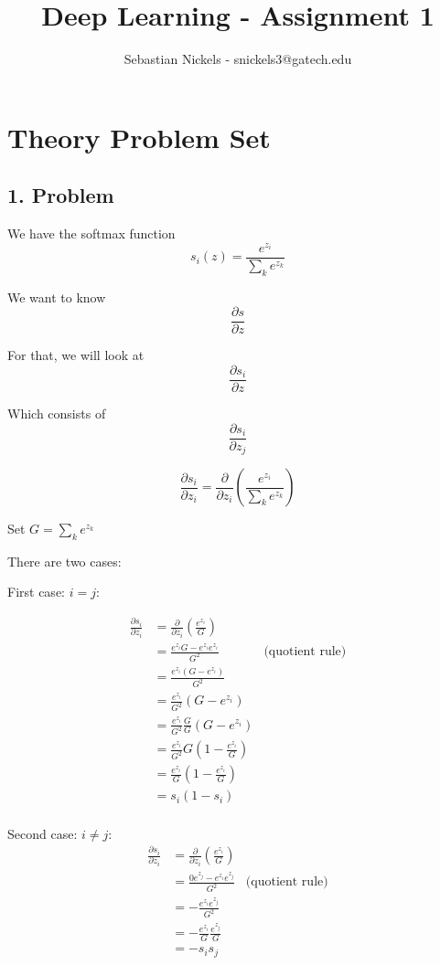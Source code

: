 \documentclass[11pt]{article}
\title{Deep Learning - Assignment 1}
\author{Sebastian Nickels - snickels3@gatech.edu}
\begin{document}
\maketitle

\section{Theory Problem Set}

\newpage

\subsection*{1. Problem}
We have the softmax function $$s_i(z) = \frac{e^{z_i}}{\sum_k e^{z_k}}$$

We want to know $$\frac{\partial s}{\partial z}$$

For that, we will look at $$\frac{\partial s_i}{\partial z}$$

Which consists of $$\frac{\partial s_i}{\partial z_j}$$

$$\frac{\partial s_i}{\partial z_i} = \frac{\partial }{\partial z_i} \left(\frac{e^{z_i}}{\sum_k e^{z_k}}\right)$$

Set $G = \sum_k e^{z_k}$

There are two cases:

First case: $i = j$:

\begin{align*}
\frac{\partial s_i}{\partial z_i} &= \frac{\partial }{\partial z_i} (\frac{e^{z_i}}{G}) \\
&= \frac{e^{z_i} G - e^{z_i} e^{z_i}}{G^2} & \text{(quotient rule)}  \\
&= \frac{e^{z_i}(G - e^{z_i})}{G^2} \\
&= \frac{e^{z_i}}{G^2}(G - e^{z_i}) \\
&= \frac{e^{z_i}}{G^2} \frac{G}{G} (G - e^{z_i}) \\
&= \frac{e^{z_i}}{G^2} G (1 - \frac{e^{z_i}}{G}) \\
&= \frac{e^{z_i}}{G} (1 - \frac{e^{z_i}}{G}) \\
&= s_i (1 - s_i) \\
\end{align*}

Second case: $i \neq j$:
\begin{align*}
\frac{\partial s_i}{\partial z_i} &= \frac{\partial }{\partial z_i} (\frac{e^{z_i}}{G}) \\
&= \frac{0 e^{z_j} - e^{z_i} e^{z_j}}{G^2} & \text{(quotient rule)} \\
&= - \frac{e^{z_i} e^{z_j}}{G^2} \\
&= - \frac{e^{z_i}}{G} \frac{e^{z_j}}{G} \\
&= - s_i s_j \\
\end{align*}
\end{document}
